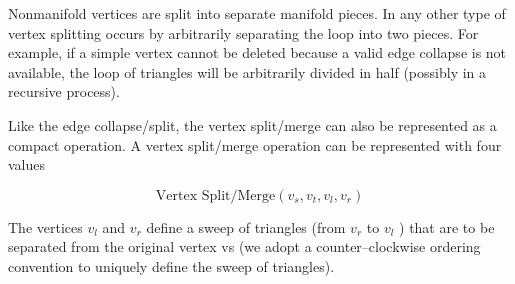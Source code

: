\begin{description}[leftmargin=0cm,labelindent=0cm]
Nonmanifold vertices are split into separate manifold pieces. In any other type of vertex splitting occurs by arbitrarily separating the loop into two pieces. For example, if a simple vertex cannot be deleted because a valid edge collapse is not available, the loop of triangles will be arbitrarily divided in half (possibly in a recursive process).

Like the edge collapse/split, the vertex split/merge can also be represented as a compact operation. A vertex split/merge operation can be represented with four values

\begin{equation}\label{eq:9.18}
\text{Vertex Split/Merge}(v_s, v_t, v_l, v_r)
\end{equation}

The vertices $v_l$ and $v_r$ define a sweep of triangles (from $v_r$ to $v_l$ ) that are to be separated from the original vertex vs (we adopt a counter--clockwise ordering convention to uniquely define the sweep of triangles).


\end{description}
